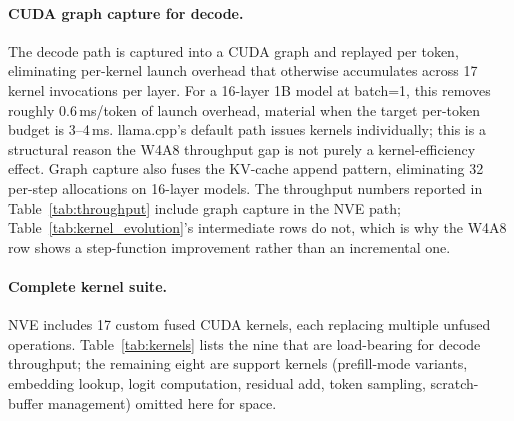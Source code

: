 \documentclass{article}
\begin{document}
\paragraph{CUDA graph capture for decode.} The decode path is captured into a CUDA graph
and replayed per token, eliminating per-kernel launch overhead that otherwise accumulates
across 17 kernel invocations per layer. For a 16-layer 1B model at batch=1, this removes
roughly 0.6\,ms/token of launch overhead, material when the target per-token budget is
3--4\,ms. llama.cpp's default path issues kernels individually; this is a structural
reason the W4A8 throughput gap is not purely a kernel-efficiency effect. Graph capture
also fuses the KV-cache append pattern, eliminating 32 per-step allocations on 16-layer
models. The throughput numbers reported in Table~\ref{tab:throughput} include graph
capture in the NVE path; Table~\ref{tab:kernel_evolution}'s intermediate rows do not,
which is why the W4A8 row shows a step-function improvement rather than an incremental one.

\paragraph{Complete kernel suite.} NVE includes 17 custom fused CUDA kernels, each
replacing multiple unfused operations. Table~\ref{tab:kernels} lists the nine that are
load-bearing for decode throughput; the remaining eight are support kernels
(prefill-mode variants, embedding lookup, logit computation, residual add, token
sampling, scratch-buffer management) omitted here for space.
\end{document}
